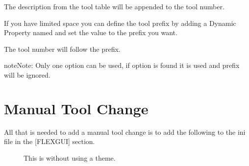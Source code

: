 \documentclass[letterpaper,10pt,english]{sphinxmanual}
\begin{document}

\sphinxAtStartPar
The description from the tool table will be appended to the tool number.


\sphinxAtStartPar
If you have limited space you can define the tool prefix by adding a Dynamic
Property named  and set the value to the prefix you want.


\sphinxAtStartPar
The tool number will follow the prefix.


\begin{sphinxadmonition}{note}{Note:}
\sphinxAtStartPar
Only one option can be used, if option is found it is used and prefix
will be ignored.
\end{sphinxadmonition}


\section{Manual Tool Change}
\label{\detokenize{tools:manual-tool-change}}
\sphinxAtStartPar
All that is needed to add a manual tool change is to add the following to the
ini file in the {[}FLEXGUI{]} section.

\begin{sphinxVerbatim}[commandchars=\\\{\}]
\PYG{p}{[}\PYG{p}{]}
  
\end{sphinxVerbatim}

\begin{figure}[htbp]
\centering
\capstart

\noindent{}
\caption{This is without using a theme.}\label{\detokenize{tools:id2}}\end{figure}
\end{document}
